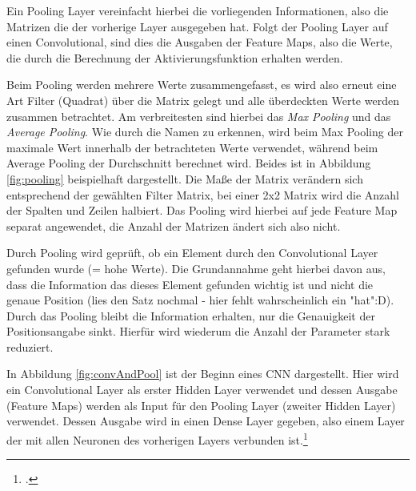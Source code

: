 Ein Pooling Layer vereinfacht hierbei die vorliegenden Informationen, also die Matrizen die der vorherige Layer ausgegeben hat. Folgt der Pooling Layer auf einen Convolutional, sind dies die Ausgaben der Feature Maps, also die Werte, die durch die Berechnung der Aktivierungsfunktion erhalten werden.

Beim Pooling werden mehrere Werte zusammengefasst, es wird also erneut eine Art Filter (Quadrat) über die Matrix gelegt und alle überdeckten Werte werden zusammen betrachtet. Am verbreitesten sind hierbei das \textit{Max Pooling} und das \textit{Average Pooling}. Wie durch die Namen zu erkennen, wird beim Max Pooling der maximale Wert innerhalb der betrachteten Werte verwendet, während beim Average Pooling der Durchschnitt berechnet wird. Beides ist in Abbildung \ref{fig:pooling} beispielhaft dargestellt. Die Maße der Matrix verändern sich entsprechend der gewählten Filter Matrix, bei einer 2x2 Matrix wird die Anzahl der Spalten und Zeilen halbiert.
Das Pooling wird hierbei auf jede Feature Map separat angewendet, die Anzahl der Matrizen ändert sich also nicht. 

Durch Pooling wird geprüft, ob ein Element durch den Convolutional Layer gefunden wurde (= hohe Werte). Die Grundannahme geht hierbei davon aus, dass die Information das dieses Element gefunden wichtig ist und nicht die genaue Position (lies den Satz nochmal - hier fehlt wahrscheinlich ein "hat":D). Durch das Pooling bleibt die Information erhalten, nur die Genauigkeit der Positionsangabe sinkt. Hierfür wird wiederum die Anzahl der Parameter stark reduziert. 

In Abbildung \ref{fig:convAndPool} ist der Beginn eines \ac{CNN} dargestellt. Hier wird ein Convolutional Layer als erster Hidden Layer verwendet und dessen Ausgabe (Feature Maps) werden als Input für den Pooling Layer (zweiter Hidden Layer) verwendet. Dessen Ausgabe wird in einen Dense Layer gegeben, also einem Layer der mit allen Neuronen des vorherigen Layers verbunden ist.\footcite[Vgl.][S. 169-171]{nielsenNeuralNetworksDeep2015}

